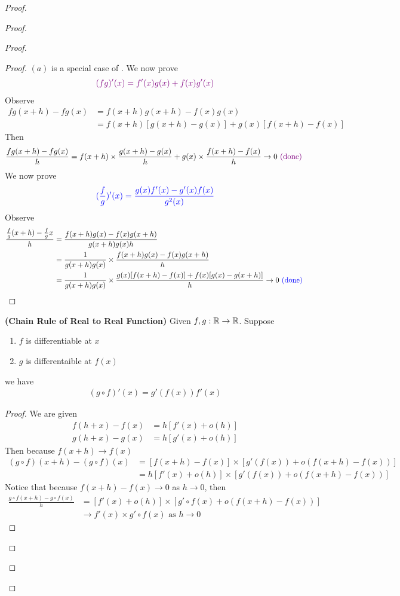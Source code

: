 \documentclass{report}
\begin{document}
\begin{proof}
\begin{proof}
\begin{proof}
\begin{proof}
$(a)$ is a special case of . We now prove 
\begin{align*}
  \textcolor{violet}{(fg)'(x)=f'(x)g(x)+f(x)g'(x)}
\end{align*}
Observe 
\begin{align*}
fg(x+h)-fg(x)&=f(x+h)g(x+h)-f(x)g(x)\\
&=f(x+h)[g(x+h)-g(x)]+g(x)[f(x+h)-f(x)]
\end{align*}
Then 
\begin{align*}
\frac{fg(x+h)-fg(x)}{h}=f(x+h) \times \frac{g(x+h)-g(x)}{h}+ g(x) \times \frac{f(x+h)-f(x)}{h} \to 0 \textcolor{violet}{\text{ (done) }}
\end{align*}
We now prove 
\begin{align*}
  \textcolor{blue}{(\frac{f}{g})'(x)=\frac{g(x)f'(x)-g'(x)f(x)}{g^2(x)}}
\end{align*}
Observe 
\begin{align*}
\frac{\frac{f}{g}(x+h)-\frac{f}{g}x}{h}&=\frac{f(x+h)g(x)-f(x)g(x+h)}{g(x+h)g(x)h}\\
&=\frac{1}{g(x+h)g(x)} \times \frac{f(x+h)g(x)-f(x)g(x+h)}{h}\\
&=\frac{1}{g(x+h)g(x)}\times \frac{g(x) [f(x+h)-f(x)]+f(x)[g(x)-g(x+h)]}{h} \to 0 \textcolor{blue}{\text{ (done) }}
\end{align*}
\end{proof}
\begin{theorem}
\label{6.1.4}
\textbf{(Chain Rule of Real to Real Function)} Given $f,g:\mathbb{R}\rightarrow \mathbb{R}$. Suppose 
\begin{enumerate}[label=(\alph*)]
  \item $f$ is differentiable at  $x$ 
  \item  $g$ is differentaible at  $f(x)$
\end{enumerate}
we have 
\begin{align*}
  (g \circ  f)'(x)=g'(f(x)) f'(x)
\end{align*}
\end{theorem}
\begin{proof}
We are given 
\begin{align*}
f(h+x)-f(x)&=h[f'(x)+o(h)]\\
g(h+x)-g(x)&=h[g'(x)+o(h)]
\end{align*}
Then because $f(x+h)\to f(x)$ 
\begin{align*}
  (g\circ f)(x+h)- (g\circ f)(x)&= [f(x+h)-f(x)]\times [g'(f(x))+o(f(x+h)-f(x))]\\
  &=h[f'(x)+o(h)]\times [g'(f(x))+o (f(x+h)-f(x))]
\end{align*}
Notice that because $f(x+h)-f(x)\to 0$ as $h \to 0$, then 
\begin{align*}
\frac{g \circ  f(x+h)-g \circ  f(x)}{h}&=[f'(x)+o(h)]\times [g'\circ  f(x)+ o (f(x+h)-f(x))]\\
&\to f'(x) \times g' \circ  f(x) \text{ as  }h\to 0
\end{align*}
\end{proof}

\end{proof}
\end{proof}
\end{proof}
\end{document}
